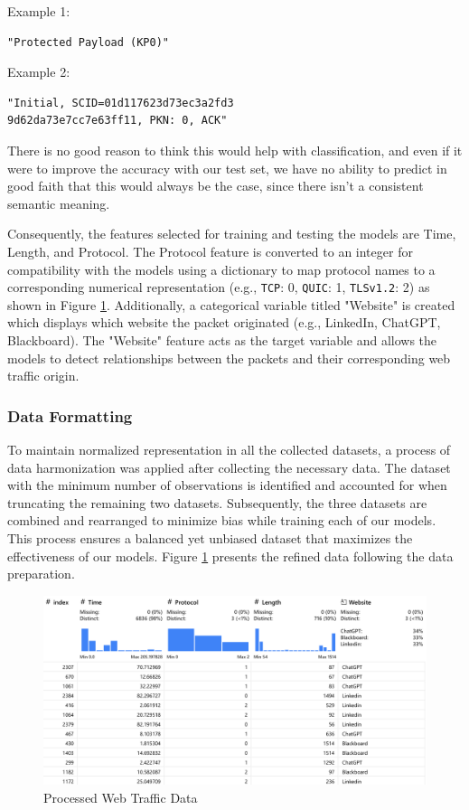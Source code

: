 \documentclass[10pt,sigconf,letterpaper,nonacm]{acmart}
\begin{document}
Example 1:
\begin{verbatim}
"Protected Payload (KP0)"
\end{verbatim}

Example 2:
\begin{verbatim}
"Initial, SCID=01d117623d73ec3a2fd3
9d62da73e7cc7e63ff11, PKN: 0, ACK"
\end{verbatim}

There is no good reason to think this would help with classification, and even if it were to improve the accuracy with our test set, we have no ability to predict in good faith that this would always be the case, since there isn't a consistent semantic meaning.

Consequently, the features selected for training and testing the models are Time, Length, and Protocol. The Protocol feature is converted to an integer for compatibility with 
the models using a dictionary to map protocol names to a corresponding numerical representation (e.g., \texttt{TCP}: 0, \texttt{QUIC}: 1, \texttt{TLSv1.2}: 2) as shown in Figure \ref{fig:webTraffic}.  Additionally, a categorical variable titled "Website" 
is created which displays which website the packet originated (e.g., LinkedIn, ChatGPT, Blackboard). The "Website" feature acts as the target variable and allows 
the models to detect relationships between the packets and their corresponding web traffic origin. 

\subsubsection{Data Formatting}
To maintain normalized representation in all the collected datasets, a process of data harmonization 
was applied after collecting the necessary data. The dataset with the minimum number of observations is identified and accounted for when
truncating the remaining two datasets. Subsequently, the three datasets are combined and rearranged to minimize bias while training each of our models.
This process ensures a balanced yet unbiased dataset that maximizes the effectiveness of our models. Figure \ref{fig:webTraffic} presents the refined data following the data preparation. 

\begin{figure}[htp] 
  \centering
  \includegraphics[width=\textwidth]{Figures_and_Graphs/fullDataDiagram.png}
  \caption{Processed Web Traffic Data}
  \label{fig:webTraffic}
\end{figure}
\end{document}
